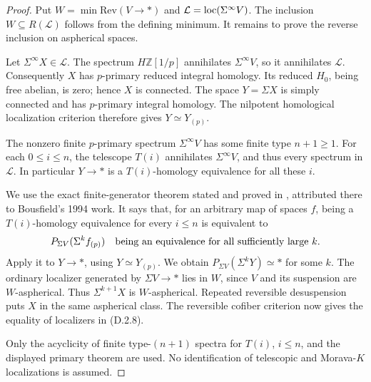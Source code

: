 \begin{proof}
Put $W=\min\mathrm{Rev}(V\to *)$ and
$\mathcal L=\operatorname{loc}(\Sigma^\infty V)$. The inclusion
$W\subseteq R(\mathcal L)$ follows from the defining minimum.
It remains to prove the reverse inclusion on aspherical spaces.

Let $\Sigma^\infty X\in\mathcal L$. The spectrum $H\mathbb Z[1/p]$
annihilates $\Sigma^\infty V$, so it annihilates $\mathcal L$.
Consequently $X$ has $p$-primary reduced integral homology. Its
reduced $H_0$, being free abelian, is zero; hence $X$ is connected.
The space $Y=\Sigma X$ is simply connected and has $p$-primary
integral homology. The nilpotent homological localization criterion
therefore gives $Y\simeq Y_{(p)}$.

The nonzero finite $p$-primary spectrum $\Sigma^\infty V$ has some
finite type $n+1\geq1$. For each $0\leq i\leq n$, the telescope
$T(i)$ annihilates $\Sigma^\infty V$, and thus every spectrum in
$\mathcal L$. In particular $Y\to *$ is a $T(i)$-homology
equivalence for all these $i$.

We use the exact finite-generator theorem stated and proved in
\citet[Theorem~4.1]{FGHBarkanHeutsShi2026}, attributed there to
Bousfield's 1994 work. It says that, for an arbitrary map of spaces
$f$, being a $T(i)$-homology equivalence for every $i\leq n$ is
equivalent to
\[
 P_{\Sigma V}(\Sigma^k f_{(p)})
 \quad\hbox{being an equivalence for all sufficiently large }k.
\]
Apply it to $Y\to *$, using $Y\simeq Y_{(p)}$. We obtain
$P_{\Sigma V}(\Sigma^kY)\simeq *$ for some $k$.
The ordinary localizer generated by $\Sigma V\to *$ lies in $W$,
since $V$ and its suspension are $W$-aspherical. Thus
$\Sigma^{k+1}X$ is $W$-aspherical. Repeated reversible
desuspension puts $X$ in the same aspherical class. The reversible
cofiber criterion now gives the equality of localizers in
\textup{(D.2.8)}.

Only the acyclicity of finite type-$(n+1)$ spectra for $T(i)$,
$i\leq n$, and the displayed primary theorem are used. No
identification of telescopic and Morava-$K$ localizations is assumed.
\end{proof}

